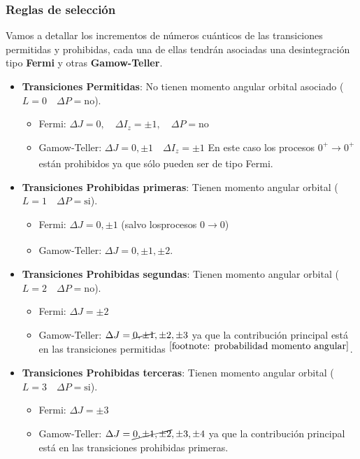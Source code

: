 \subsubsection{Reglas de selección}
Vamos a detallar los incrementos de números cuánticos de las transiciones permitidas y prohibidas, cada una de ellas tendrán asociadas una desintegración tipo \textbf{Fermi} y otras \textbf{Gamow-Teller}.
\begin{itemize}
    \item \textbf{Transiciones Permitidas}: No tienen momento angular orbital asociado ($L=0  \quad \Delta P=\mathrm{no}$).
    \begin{itemize}
        \item Fermi: $\Delta J=0, \quad \Delta I_z=\pm1, \quad \Delta P=\mathrm{no}$ 
        \item Gamow-Teller: $\Delta J=0,\pm 1 \quad \Delta I_z=\pm1$ En este caso los procesos $0^+\xrightarrow[]{}0^+$ están prohibidos ya que sólo pueden ser de tipo Fermi.
    \end{itemize}
    \item \textbf{Transiciones Prohibidas primeras}: Tienen momento angular orbital ($L=1  \quad \Delta P=\mathrm{si}$).
    \begin{itemize}
        \item Fermi: $\Delta J=0,\pm 1$ (salvo losprocesos $0\xrightarrow[]{}0$)
        \item Gamow-Teller: $\Delta J=0,\pm1, \pm 2 $.
    \end{itemize}
    \item \textbf{Transiciones Prohibidas segundas}: Tienen momento angular orbital ($L=2  \quad \Delta P=\mathrm{no}$).
    \begin{itemize}
        \item Fermi: $\Delta J=\pm 2$
        \item Gamow-Teller: $\Delta J=\cancel{0,\pm1},\pm2,\pm3 $ ya que la contribución principal está en las transiciones permitidas $^{\ref{footnote: probabilidad momento angular}}$.
    \end{itemize}
        \item \textbf{Transiciones Prohibidas terceras}: Tienen momento angular orbital ($L=3  \quad \Delta P=\mathrm{si}$).
    \begin{itemize}
        \item Fermi: $\Delta J=\pm 3$
        \item Gamow-Teller: $\Delta J=\cancel{0,\pm1, \pm 2},\pm3,\pm4 $ ya que la contribución principal está en las transiciones prohibidas primeras.

\end{itemize}
\end{itemize}

